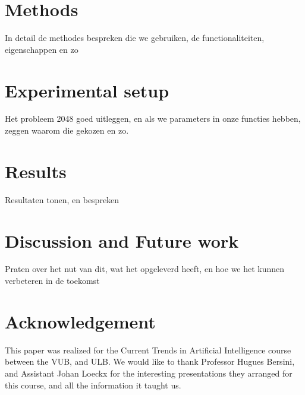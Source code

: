 \documentclass[a4paper,12pt]{article}
\begin{document}
\section{Methods}
In detail de methodes bespreken die we gebruiken, de functionaliteiten, eigenschappen en zo

\section{Experimental setup}
Het probleem 2048 goed uitleggen, en als we parameters in onze functies hebben, zeggen waarom die gekozen en zo.

\section{Results}
Resultaten tonen, en bespreken
\section{Discussion and Future work}
Praten over het nut van dit, wat het opgeleverd heeft, en hoe we het kunnen verbeteren in de toekomst
\section{Acknowledgement}
This paper was realized for the Current Trends in Artificial Intelligence course between the VUB, and ULB.
We would like to thank Professor Hugues Bersini, and Assistant Johan Loeckx for the interesting presentations they arranged for this course, and all the information it taught us.
\nocite{*}


\end{document}
